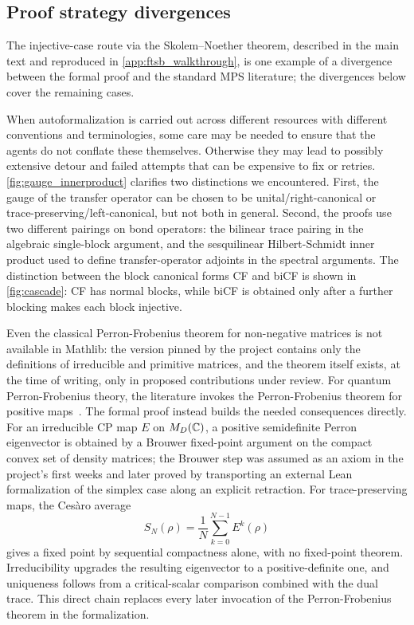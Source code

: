 \subsection{Proof strategy divergences}

The injective-case route via the Skolem--Noether theorem, described in the main text and reproduced in \cref{app:ftsb_walkthrough}, is one example of a divergence between the formal proof and the standard MPS literature; the divergences below cover the remaining cases.

When autoformalization is carried out across different resources with different conventions and terminologies, some care may be needed to ensure that the agents do not conflate these themselves. Otherwise they may lead to possibly extensive detour and failed attempts that can be expensive to fix or retries.
\cref{fig:gauge_innerproduct} clarifies two distinctions we encountered. First, the gauge of the transfer operator can be chosen to be unital/right-canonical or trace-preserving/left-canonical, but not both in general. Second, the proofs use two different pairings on bond operators: the bilinear trace pairing in the algebraic single-block argument, and the sesquilinear Hilbert-Schmidt inner product used to define transfer-operator adjoints in the spectral arguments. The distinction between the block canonical forms CF and biCF is shown in \cref{fig:cascade}: CF has normal blocks, while biCF is obtained only after a further blocking makes each block injective.  






Even the classical Perron-Frobenius theorem for non-negative matrices is not available in Mathlib: the version pinned by the project contains only the definitions of irreducible and primitive matrices, and the theorem itself exists, at the time of writing, only in proposed contributions under review.
For quantum Perron-Frobenius theory, the literature invokes the Perron-Frobenius theorem for positive maps~\cite{Wolf2012Quantum}. The formal proof instead builds the needed consequences directly. For an irreducible CP map $E$ on $M_D(\mathbb{C})$, a positive semidefinite Perron eigenvector is obtained by a Brouwer fixed-point argument on the compact convex set of density matrices; the Brouwer step was assumed as an axiom in the project's first weeks and later proved by transporting an external Lean formalization of the simplex case along an explicit retraction.
For trace-preserving maps, the Ces\`aro average
\begin{equation}
    S_N(\rho)=\frac{1}{N}\sum_{k=0}^{N-1}E^k(\rho)\label{eq: cesaro}
\end{equation}
gives a fixed point by sequential compactness alone, with no fixed-point theorem. Irreducibility upgrades the resulting eigenvector to a positive-definite one, and uniqueness follows from a critical-scalar comparison combined with the dual trace. This direct chain replaces every later invocation of the Perron-Frobenius theorem in the formalization.


